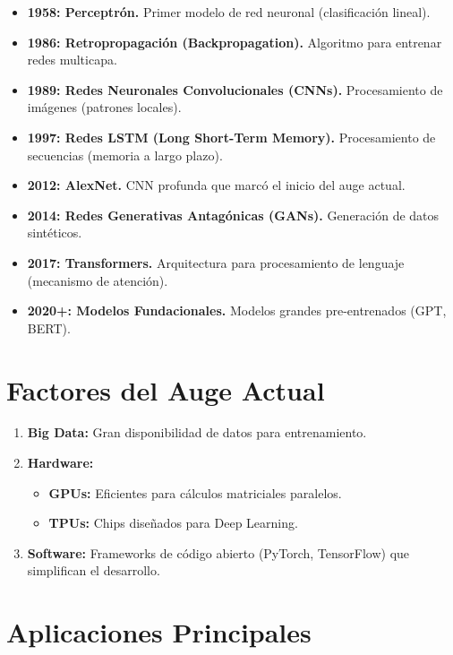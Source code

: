 \documentclass{article}
\begin{document}
\begin{itemize}
    \item \textbf{1958: Perceptrón.} Primer modelo de red neuronal (clasificación lineal).
    \item \textbf{1986: Retropropagación (Backpropagation).} Algoritmo para entrenar redes multicapa.
    \item \textbf{1989: Redes Neuronales Convolucionales (CNNs).} Procesamiento de imágenes (patrones locales).
    \item \textbf{1997: Redes LSTM (Long Short-Term Memory).} Procesamiento de secuencias (memoria a largo plazo).
    \item \textbf{2012: AlexNet.} CNN profunda que marcó el inicio del auge actual.
    \item \textbf{2014: Redes Generativas Antagónicas (GANs).} Generación de datos sintéticos.
    \item \textbf{2017: Transformers.} Arquitectura para procesamiento de lenguaje (mecanismo de atención).
    \item \textbf{2020+: Modelos Fundacionales.} Modelos grandes pre-entrenados (GPT, BERT).
\end{itemize}

\section{Factores del Auge Actual}

\begin{enumerate}
    \item \textbf{Big Data:} Gran disponibilidad de datos para entrenamiento.
    \item \textbf{Hardware:}
        \begin{itemize}
            \item \textbf{GPUs:} Eficientes para cálculos matriciales paralelos.
            \item \textbf{TPUs:} Chips diseñados para Deep Learning.
        \end{itemize}
    \item \textbf{Software:} Frameworks de código abierto (PyTorch, TensorFlow) que simplifican el desarrollo.
\end{enumerate}

\section{Aplicaciones Principales}
\end{document}

